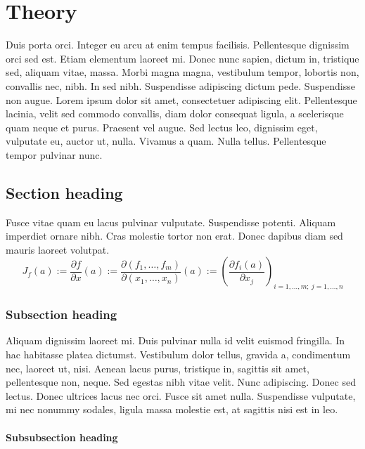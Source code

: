 
\chapter{Theory}

Duis porta orci. Integer eu arcu at enim tempus facilisis. Pellentesque dignissim orci sed est. Etiam elementum laoreet mi. Donec nunc sapien, dictum in, tristique sed, aliquam vitae, massa. Morbi magna magna, vestibulum tempor, lobortis non, convallis nec, nibh. In sed nibh. Suspendisse adipiscing dictum pede. Suspendisse non augue. Lorem ipsum dolor sit amet, consectetuer adipiscing elit. Pellentesque lacinia, velit sed commodo convallis, diam dolor consequat ligula, a scelerisque quam neque et purus. Praesent vel augue. Sed lectus leo, dignissim eget, vulputate eu, auctor ut, nulla. Vivamus a quam. Nulla tellus. Pellentesque tempor pulvinar nunc.


\section{Section heading}

Fusce vitae quam eu lacus pulvinar vulputate. Suspendisse potenti. Aliquam imperdiet ornare nibh. Cras molestie tortor non erat. Donec dapibus diam sed mauris laoreet volutpat. 
%
\begin{equation}
  J_f(a) := \frac{\partial {f}}{\partial {x}}(a) 
         := \frac{\partial(f_1,  \ldots, f_m)}{\partial(x_1, \ldots, x_n)}(a)
         := \left(\frac{\partial f_i(a)}{\partial x_j}\right)_{i=1,\ldots,m;\
             j=1,\ldots,n}
\end{equation}

\subsection{Subsection heading}

Aliquam dignissim laoreet mi. Duis pulvinar nulla id velit euismod fringilla. In hac habitasse platea dictumst. Vestibulum dolor tellus, gravida a, condimentum nec, laoreet ut, nisi. Aenean lacus purus, tristique in, sagittis sit amet, pellentesque non, neque. Sed egestas nibh vitae velit. Nunc adipiscing. Donec sed lectus. Donec ultrices lacus nec orci. Fusce sit amet nulla. Suspendisse vulputate, mi nec nonummy sodales, ligula massa molestie est, at sagittis nisi est in leo.

\subsubsection{Subsubsection heading}

